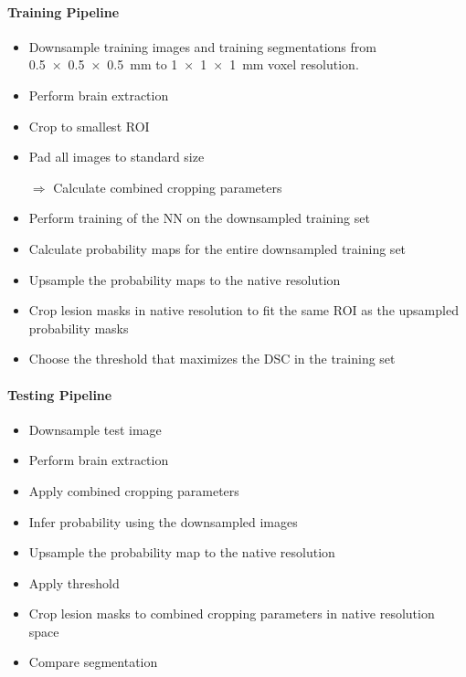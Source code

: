 \paragraph{Training Pipeline}
\begin{itemize}
\item Downsample training images and training segmentations from
\SI{0.5x0.5x0.5}{\milli\meter} to \SI{1x1x1}{\milli\meter} voxel resolution.
\item Perform brain extraction
\item Crop to smallest ROI
\item Pad all images to standard size
\item[$\Rightarrow$] Calculate combined cropping parameters
\item Perform training of the NN on the downsampled training set
\item Calculate probability maps for the entire downsampled training set
\item Upsample the probability maps to the native resolution
\item Crop lesion masks in native resolution to fit the same ROI as the
upsampled probability masks
\item Choose the threshold that maximizes the DSC in the training set 
\end{itemize}

\paragraph{Testing Pipeline}
\begin{itemize}
\item Downsample test image
\item Perform brain extraction
\item Apply combined cropping parameters
\item Infer probability using the downsampled images
\item Upsample the probability map to the native resolution
\item Apply threshold
\item Crop lesion masks to combined cropping parameters in native resolution
space
\item Compare segmentation
\end{itemize}









